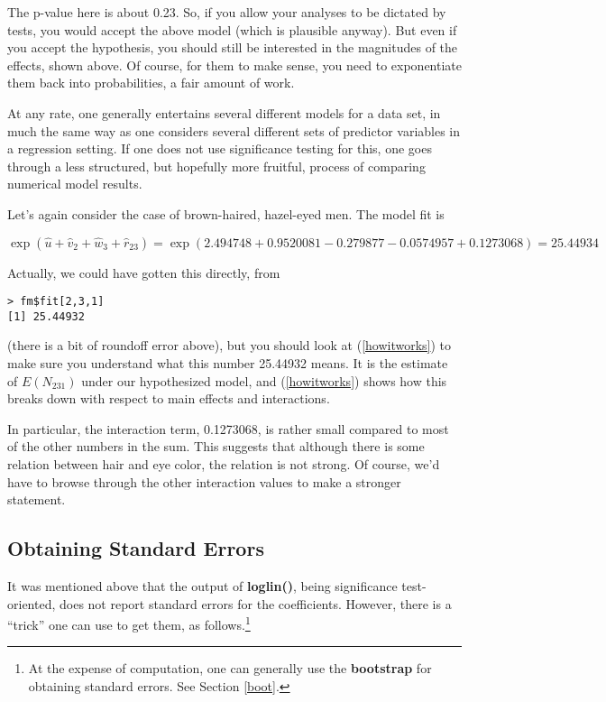 The p-value here is about 0.23.  So, if you allow your analyses to be
dictated by tests, you would accept the above model (which is plausible
anyway).  But even if you accept the hypothesis, you should still be
interested in the magnitudes of the effects, shown above.  Of course,
for them to make sense, you need to exponentiate them back into
probabilities, a fair amount of work.

At any rate, one generally entertains several different models for a
data set, in much the same way as one considers several different sets
of predictor variables in a regression setting.  If one does not use
significance testing for this, one goes through a less structured, but
hopefully more fruitful, process of comparing numerical model results.

Let's again consider the case of brown-haired, hazel-eyed men.  The
model fit is  

\begin{equation}
\label{howitworks}
\exp{(
\hat{u} + \hat{v}_2 + \hat{w}_3 + \hat{r}_{23}
)}
=
\exp(2.494748 + 0.9520081 - 0.279877 - 0.0574957 + 0.1273068) = 25.44934
\end{equation}

Actually, we could have gotten this directly, from

\begin{lstlisting}
> fm$fit[2,3,1]
[1] 25.44932  
\end{lstlisting}

(there is a bit of roundoff error above), but you should look at
(\ref{howitworks}) to make sure you understand what this number 25.44932
means.  It is the estimate of $E(N_{231})$ under our hypothesized model,
and (\ref{howitworks}) shows how this breaks down with respect to main
effects and interactions.

In particular, the interaction term, 0.1273068, is rather small compared
to most of the other numbers in the sum.  This suggests that although
there is some relation between hair and eye color, the relation is not
strong.  Of course, we'd have to browse through the other interaction
values to make a stronger statement.

\subsection{Obtaining Standard Errors}

It was mentioned above that the output of {\bf loglin()}, being
significance test-oriented, does not report standard errors for the
coefficients.  However, there is a ``trick'' one can use to get them, as
follows.\footnote{At the expense of computation, one can generally use
the {\bf bootstrap} for obtaining standard errors.  See Section
\ref{boot}.}

